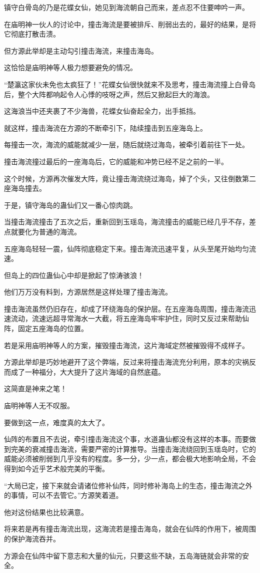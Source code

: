 \begin{this_body}
镇守白骨岛的乃是花蝶女仙，她见到海流朝自己而来，差点忍不住要呻吟一声。

在庙明神一伙人的讨论中，撞击海流是要被排斥、削弱出去的，最好的结果，是将它彻底打散击溃。

但方源此举却是主动勾引撞击海流，来撞击海岛。

这恰恰是庙明神等人极力想要避免的情况。

“楚瀛这家伙未免也太疯狂了！”花蝶女仙很快就来不及思考，撞击海流撞上白骨岛后，整个大阵都响起令人心悸的吱呀之声，然后又掀起巨大的海浪。

这海浪当中还夹裹了不少海兽，花蝶女仙奋起全力，出手抵挡。

就这样，撞击海流在方源的不断牵引下，陆续撞击到五座海岛上。

每撞击一次，海流的威能就减少一层，随后就绕过海岛，被牵引着前往下一处。

撞击海流撞过最后的一座海岛后，它的威能和冲势已经不足之前的一半。

这个时候，方源再次催发大阵，竟让撞击海流绕过海岛，掉了个头，又往倒数第二座海岛撞去。

于是，镇守海岛的蛊仙们又一番心惊肉跳。

当撞击海流撞击了五次之后，重新回到玉瑶岛，海流撞击的威能已经几乎不存，差点就要化为普通的海流。

五座海岛轻轻一震，仙阵彻底稳定下来。撞击海流迅速平复，从头至尾开始均匀流速。

但岛上的四位蛊仙心中却是掀起了惊涛骇浪！

他们万万没有料到，方源居然是这样处理了撞击海流。

撞击海流虽然仍旧存在，却成了环绕海岛的保护层。在五座海岛周围，撞击海流迅速流动，流速远超寻常海水一大截，将五座海岛牢牢护住，同时又反过来帮助仙阵，固定五座海岛的位置。

若是采用庙明神等人的方案，摧毁撞击海流，这片海域定然被摧毁得不成样子。

方源此举却是巧妙地避开了这个弊端，反过来将撞击海流充分利用，原本的灾祸反而成了一种福分，大大提升了这片海域的自然底蕴。

这简直是神来之笔！

庙明神等人无不叹服。

要做到这一点，难度真的太大了。

仙阵的布置且不去说，牵引撞击海流这个事，水道蛊仙都没有这样的本事。而要做到完美的衰减撞击海流，需要严密的计算推导。当撞击海流绕回到玉瑶岛时，它的威能必须被削弱到几乎没有的程度。多一分，少一点，都会极大地影响全局，不会得到如今近乎艺术般完美的平衡。

“大局已定，接下来就会请诸位修补仙阵，同时修补海岛上的生态，撞击海流之外的事情，可以不去管它。”方源笑着道。

他对这份结果也比较满意。

将来若是再有撞击海流出现，这海流若是撞击海岛，就会在仙阵的作用下，被周围的保护海流吞并。

方源会在仙阵中留下意志和大量的仙元，只要这些不缺，五岛海链就会非常的安全。

\end{this_body}

